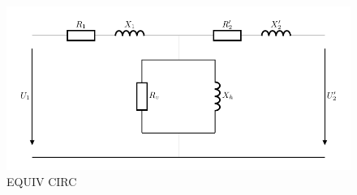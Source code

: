 \lipsum

\begin{figure}
    \begin{small}
        \begin{center}
            \includegraphics[width=0.95\columnwidth]{fig/eq.pdf}
        \end{center}
        \caption{EQUIV CIRC}
        \label{fig:eq}
    \end{small}
\end{figure}